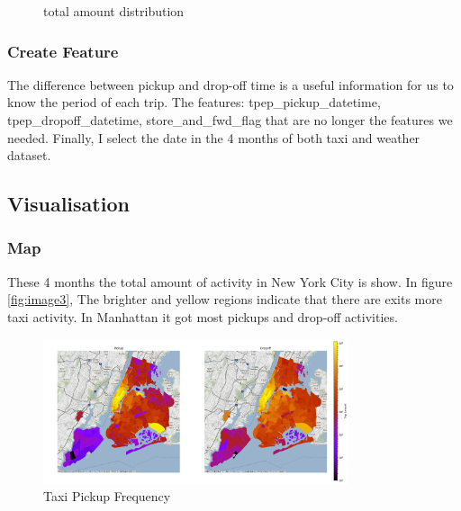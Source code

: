 \documentclass[11pt]{article}
\begin{document}
\begin{figure}[!h]
    \centering
    \caption{total amount distribution} %
    \label{fig:image2}
\end{figure}

\subsubsection{Create Feature}

The diﬀerence between pickup and drop-oﬀ time is a useful information for us to know the  period of each trip. The features: tpep\_pickup\_datetime, tpep\_dropoff\_datetime, store\_and\_fwd\_flag that are no longer the features we needed. Finally, I select the date in the 4 months of both taxi and weather dataset.

\subsection{Visualisation}
\subsubsection{Map}

These 4 months the total amount of activity in New York City is show. In ﬁgure \ref{fig:image3}, The brighter and yellow regions indicate that there are exits more taxi activity. In Manhattan it got most pickups and drop-off activities.

\begin{figure}[!h]
    \centering
    \includegraphics[width=0.8\textwidth]{plots/p3.png}
    \caption{Taxi Pickup Frequency} %
    \label{fig:image2}
\end{figure}
\end{document}
